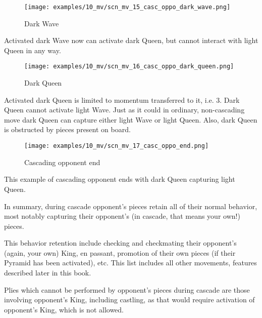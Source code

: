 \clearpage %

\noindent
\begin{wrapfigure}[5]{l}{0.5625\textwidth}
\centering
\texttt{[image: examples/10\_mv/scn\_mv\_15\_casc\_oppo\_dark\_wave.png]}
\caption{Dark Wave}
\label{fig:scn_mv_15_casc_oppo_dark_wave}
\end{wrapfigure}
Activated dark Wave now can activate dark Queen, but cannot interact with light Queen
in any way.

\vspace*{0.315\textheight}
\noindent
\begin{wrapfigure}[13]{r}{0.5625\textwidth}
\centering
\texttt{[image: examples/10\_mv/scn\_mv\_16\_casc\_oppo\_dark\_queen.png]}
\caption{Dark Queen}
\label{fig:scn_mv_16_casc_oppo_dark_queen}
\end{wrapfigure}
Activated dark Queen is limited to momentum transferred to it, i.e. 3. Dark Queen
cannot activate light Wave. Just as it could in ordinary, non-cascading move dark
Queen can capture either light Wave or light Queen. Also, dark Queen is obstructed
by pieces present on board.

\clearpage %

\noindent
\begin{wrapfigure}[4]{l}{0.5625\textwidth}
\centering
\texttt{[image: examples/10\_mv/scn\_mv\_17\_casc\_oppo\_end.png]}
\caption{Cascading opponent end}
\label{fig:scn_mv_17_casc_oppo_end}
\end{wrapfigure}
This example of cascading opponent ends with dark Queen capturing light Queen.

\vspace*{0.355\textheight}
In summary, during cascade opponent's pieces retain all of their normal behavior,
most notably capturing their opponent's (in cascade, that means your own!) pieces.

This behavior retention include checking and checkmating their opponent's (again,
your own) King, en passant, promotion of their own pieces (if their Pyramid has
been activated), etc. This list includes all other movements, features described
later in this book.

Plies which cannot be performed by opponent's pieces during cascade are those
involving opponent's King, including castling, as that would require activation
of opponent's King, which is not allowed.

